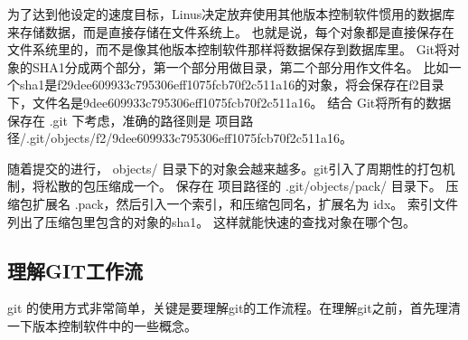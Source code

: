 为了达到他设定的速度目标，Linus决定放弃使用其他版本控制软件惯用的数据库来存储数据，而是直接存储在文件系统上。
也就是说，每个对象都是直接保存在文件系统里的，而不是像其他版本控制软件那样将数据保存到数据库里。
Git将对象的SHA1分成两个部分，第一个部分用做目录，第二个部分用作文件名。
比如一个sha1是f29dee609933c795306eff1075fcb70f2c511a16的对象，将会保存在f2目录下，文件名是9dee609933c795306eff1075fcb70f2c511a16。
结合 Git将所有的数据保存在 .git 下考虑，准确的路径则是 项目路径/.git/objects/f2/9dee609933c795306eff1075fcb70f2c511a16。

随着提交的进行， objects/ 目录下的对象会越来越多。git引入了周期性的打包机制，将松散的包压缩成一个。
保存在 项目路径的 .git/objects/pack/ 目录下。
压缩包扩展名 .pack，然后引入一个索引，和压缩包同名，扩展名为 idx。
索引文件列出了压缩包里包含的对象的sha1。
这样就能快速的查找对象在哪个包。


\subsection{理解GIT工作流}

git 的使用方式非常简单，关键是要理解git的工作流程。在理解git之前，首先理清一下版本控制软件中的一些概念。

